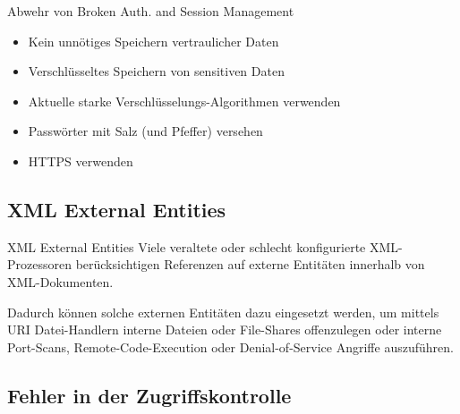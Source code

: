 \begin{bonus}{Abwehr von Broken Auth. and Session Management}
    \begin{itemize}
        \item Kein unnötiges Speichern vertraulicher Daten
        \item Verschlüsseltes Speichern von sensitiven Daten
        \item Aktuelle starke Verschlüsselungs-Algorithmen verwenden
        \item Passwörter mit Salz (und Pfeffer) versehen
        \item HTTPS verwenden
    \end{itemize}



\end{bonus}

\subsection{XML External Entities}

\begin{bonus}{XML External Entities}
    Viele veraltete oder schlecht konfigurierte XML-Prozessoren berücksichtigen Referenzen auf externe Entitäten innerhalb von XML-Dokumenten.

    Dadurch können solche externen Entitäten dazu eingesetzt werden, um mittels URI Datei-Handlern interne Dateien oder File-Shares offenzulegen oder interne Port-Scans, Remote-Code-Execution oder Denial-of-Service Angriffe auszuführen.
\end{bonus}

\subsection{Fehler in der Zugriffskontrolle}

